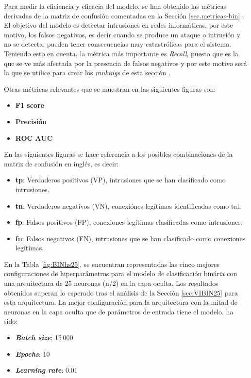 Para medir la eficiencia y eficacia del modelo, se han obtenido las métricas derivadas de la matriz de confusión comentadas en la Sección \ref{sec.metricas-bin} . El objetivo del modelo es detectar intrusiones en redes informáticas, por este motivo, los falsos negativos, es decir cuando se produce un ataque o intrusión y no se detecta, pueden tener consecuencias muy catastróficas para el sistema. Teniendo esto en cuenta, la métrica más importante es \textit{Recall}, puesto que es la que se ve más afectada por la presencia de falsos negativos y por este motivo será la que se utilice para crear los \textit{rankings} de esta sección .

Otras métricas relevantes que se muestran en las siguientes figuras son:
\begin{itemize}
	\item \textbf{F1 score}%
	\item \textbf{Precisión}%
	\item \textbf{ROC AUC}%
\end{itemize}

En las siguientes figuras se hace referencia a los posibles combinaciones de la matriz de confusión en inglés, es decir:
\begin{itemize}
	\item \textbf{tp}: Verdaderos positivos (VP), intrusiones que se han clasificado como intrusiones.
	\item \textbf{tn}: Verdaderos negativos (VN), conexiónes legítimas identificadas como tal.
	\item \textbf{fp}: Falsos positivos (FP), conexiones legítimas clasificadas como intrusiones.
	\item \textbf{fn}: Falsos negativos (FN), intrusiones que se han clasificado como conexiones legítimas.
\end{itemize}

En la Tabla \ref{fig:BINhs25}, se encuentran representadas las cinco mejores configuraciones de hiperparámetros para el modelo de clasificación binária con una arquitectura de 25 neuronas (n/2) en la capa oculta. Los resultados obtenidos superan lo esperado tras el análisis de la Sección \ref{sec:VIBIN25} para esta arquitectura. La mejor configuración para la arquitectura con la mitad de neuronas en la capa oculta que de parámetros de entrada tiene el modelo, ha sido:
\begin{itemize}
	\item \textbf{\textit{Batch size}}: 15\,000
	\item \textbf{\textit{Epochs}}: 10
	\item \textbf{\textit{Learning rate}}: 0.01
\end{itemize}


